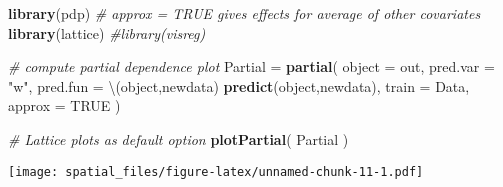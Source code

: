 \documentclass[
]{article}
\newenvironment{Shaded}{\begin{snugshade}}{\end{snugshade}}
\newcommand{\AttributeTok}[1]{\textcolor[rgb]{0.13,0.29,0.53}{#1}}
\newcommand{\CommentTok}[1]{\textcolor[rgb]{0.56,0.35,0.01}{\textit{#1}}}
\newcommand{\ConstantTok}[1]{\textcolor[rgb]{0.56,0.35,0.01}{#1}}
\newcommand{\FunctionTok}[1]{\textcolor[rgb]{0.13,0.29,0.53}{\textbf{#1}}}
\newcommand{\NormalTok}[1]{#1}
\newcommand{\OtherTok}[1]{\textcolor[rgb]{0.56,0.35,0.01}{#1}}
\newcommand{\StringTok}[1]{\textcolor[rgb]{0.31,0.60,0.02}{#1}}
\begin{document}
\begin{Shaded}
\begin{Highlighting}[]
\FunctionTok{library}\NormalTok{(pdp)  }\CommentTok{\# approx = TRUE gives effects for average of other covariates}
\FunctionTok{library}\NormalTok{(lattice)}
\CommentTok{\#library(visreg)}

\CommentTok{\# compute partial dependence plot}
\NormalTok{Partial }\OtherTok{=} \FunctionTok{partial}\NormalTok{( }\AttributeTok{object =}\NormalTok{ out,}
                   \AttributeTok{pred.var =} \StringTok{"w"}\NormalTok{,}
                   \AttributeTok{pred.fun =}\NormalTok{ \textbackslash{}(object,newdata) }\FunctionTok{predict}\NormalTok{(object,newdata),}
                   \AttributeTok{train =}\NormalTok{ Data,}
                   \AttributeTok{approx =} \ConstantTok{TRUE}\NormalTok{ )}

\CommentTok{\# Lattice plots as default option}
\FunctionTok{plotPartial}\NormalTok{( Partial )}
\end{Highlighting}
\end{Shaded}

\texttt{[image: spatial\_files/figure-latex/unnamed-chunk-11-1.pdf]}
\end{document}
